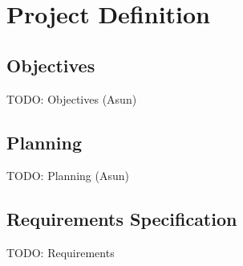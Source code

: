 \chapter{Project Definition}

\section{Objectives}

TODO: Objectives (Asun)

\section{Planning}

TODO: Planning (Asun)

\section{Requirements Specification}

TODO: Requirements
